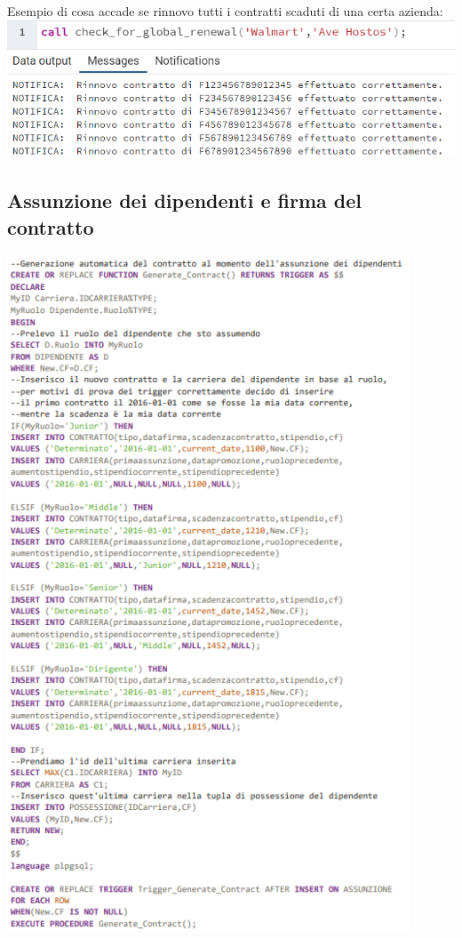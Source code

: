 \newline\newline
Esempio di cosa accade se rinnovo tutti i contratti scaduti di una certa azienda:
\newline\newline
\includegraphics[width=1.1\textwidth]{Immagini/funzione2ok.png}
\subsection{Assunzione dei dipendenti e firma del contratto}
\includegraphics[width=0.9\textwidth]{Immagini/trigger1.sql}
